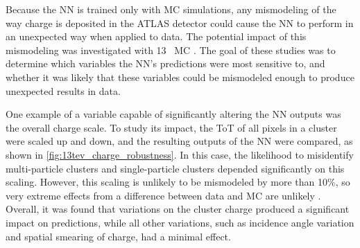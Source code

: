 Because the \ac{NN} is trained only with \ac{MC} simulations, any mismodeling of the way charge is deposited in the \ac{ATLAS} detector could cause the \ac{NN} to perform in an unexpected way when applied to data. The potential impact of this mismodeling was investigated with 13 \tev~\ac{MC} \cite{ATL-PHYS-PUB-2015-052}. The goal of these studies was to determine which variables the \ac{NN}'s predictions were most sensitive to, and whether it was likely that these variables could be mismodeled enough to produce unexpected results in data. 

One example of a variable capable of significantly altering the \ac{NN} outputs was the overall charge scale. To study its impact, the \ac{ToT} of all pixels in a cluster were scaled up and down, and the resulting outputs of the \ac{NN} were compared, as shown in \autoref{fig:13tev_charge_robustness}. In this case, the likelihood to misidentify multi-particle clusters and single-particle clusters depended significantly on this scaling. However, this scaling is unlikely to be mismodeled by more than 10\%, so very extreme effects from a difference between data and \ac{MC} are unlikely \cite{ATL-PHYS-PUB-2015-052}. Overall, it was found that variations on the cluster charge produced a significant impact on predictions, while all other variations, such as incidence angle variation and spatial smearing of charge, had a minimal effect. 

